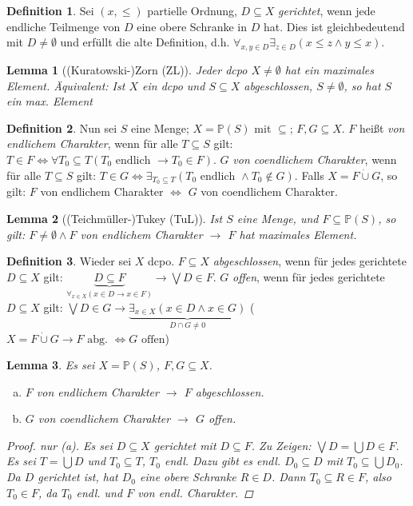 \documentclass[headsepline=true,DIV=11]{scrartcl}
\newtheorem*{lemma}{Lemma}
\theoremstyle{definition}
\newtheorem*{definition}{Definition}
\begin{document}

\begin{definition}
	Sei $(x,\le)$ partielle Ordnung, $D\subseteq X$ {\em gerichtet}, wenn jede endliche Teilmenge von $D$ eine obere Schranke in $D$ hat.
	Dies ist gleichbedeutend mit $D\neq\emptyset$ und erfüllt die alte Definition, d.h. $\forall_{x,y\in D}\exists_{z\in D}(x\le z \land y\le x)$.
\end{definition}

\begin{lemma}[(Kuratowski-)Zorn (ZL)]
	Jeder dcpo $X\neq \emptyset$ hat ein maximales Element.
	Äquivalent: Ist $X$ ein dcpo und $S\subseteq X$ abgeschlossen, $S\neq \emptyset$, so hat $S$ ein max. Element
\end{lemma}

\begin{definition}
	Nun sei $S$ eine Menge; $X=\mathbb P(S)$ mit $\subseteq$; $F,G\subseteq X$.
	$F$ heißt {\em von endlichem Charakter}, wenn für alle $T\subseteq S$ gilt: $T\in F\iff \forall T_0\subseteq T(T_0 \text{ endlich } \to T_0\in F)$.
	$G$ {\em von coendlichem Charakter}, wenn für alle $T\subseteq S$ gilt: $T\in G\iff \exists_{T_0\subseteq T}(T_0 \text{ endlich } \land T_0\notin G)$.
	Falls $X=F\dot\cup G$, so gilt: $F$ von endlichem Charakter $\iff$ $G$ von coendlichem Charakter.
\end{definition}

\begin{lemma}[(Teichmüller-)Tukey (TuL)]
	Ist $S$ eine Menge, und $F\subseteq\mathbb P(S)$, so gilt: $F\neq\emptyset \land F$ von endlichem Charakter $\to$ $F$ hat maximales Element.
\end{lemma}

\begin{definition}
	Wieder sei $X$ dcpo. 
	$F\subseteq X$ {\em abgeschlossen}, wenn für jedes gerichtete $D\subseteq X$ gilt: 
	$\underbrace{D\subseteq F}_{\forall_{x\in X}(x\in D\to x\in F)}\to \bigvee D\in F$.
	$G$ {\em offen}, wenn für jedes gerichtete $D\subseteq X$ gilt: 
	$\bigvee D\in G\to \underbrace{\exists_{x\in X}(x\in D \land x\in G)}_{D\cap G\neq 0}$
	($X=F\dot\cup G\to F \text{ abg. } \iff G \text{ offen}$)
\end{definition}

\begin{lemma}
	Es sei $X=\mathbb P(S)$, $F,G\subseteq X$.
	\begin{enumerate}[(a)]
		\item $F$ von endlichem Charakter $\to$ $F$ abgeschlossen.
		\item $G$ von coendlichem Charakter $\to$ $G$ offen.
	\end{enumerate}
	\begin{proof}
		nur (a). Es sei $D\subseteq X$ gerichtet mit $D\subseteq F$.
		Zu Zeigen: $\bigvee D=\bigcup D\in F$. 
		Es sei $T=\bigcup D$ und $T_0\subseteq T$, $T_0$ endl.
		Dazu gibt es endl. $D_0\subseteq D$ mit $T_0\subseteq\bigcup D_0$.
		Da $D$ gerichtet ist, hat $D_0$ eine obere Schranke $R\in D$.
		Dann $T_0\subseteq R\in F$, also $T_0\in F$, da $T_0$ endl. und $F$ von endl. Charakter.
	\end{proof}
\end{lemma}
\end{document}
